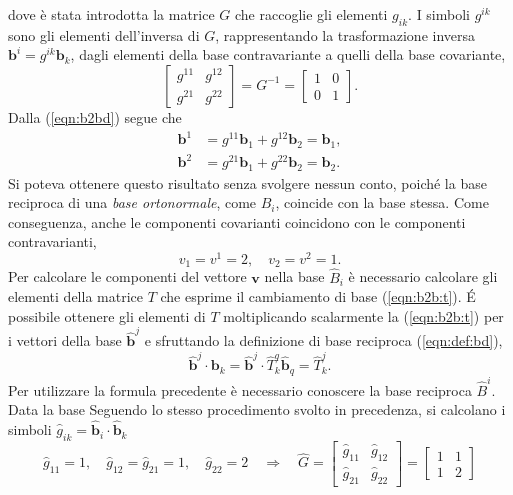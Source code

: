  dove è stata introdotta la matrice $G$ che raccoglie gli elementi $g_{ik}$. I simboli $g^{ik}$ sono gli elementi dell'inversa di $G$, rappresentando la trasformazione inversa $\bm{b}^i = g^{ik}\bm{b}_k$, dagli elementi della base contravariante a quelli della base covariante,
\begin{equation}
 \begin{bmatrix} g^{11} & g^{12} \\ g^{21} & g^{22} \end{bmatrix} = G^{-1} =
 \begin{bmatrix} 1 & 0 \\ 0 & 1 \end{bmatrix} .
\end{equation}
%
Dalla (\ref{eqn:b2bd}) segue che
\begin{equation}
\begin{aligned}
 \bm{b}^1 & = g^{11} \bm{b}_1 + g^{12} \bm{b}_2 = \bm{b}_1 , \\
 \bm{b}^2 & = g^{21} \bm{b}_1 + g^{22} \bm{b}_2 = \bm{b}_2 .
\end{aligned}
\end{equation}
Si poteva ottenere questo risultato senza svolgere nessun conto, poiché la base reciproca di una \textit{base ortonormale}, come $B_i$, coincide con la base stessa. Come conseguenza, anche le componenti covarianti coincidono con le componenti contravarianti,
\begin{equation}
  v_1 = v^1 = 2 , \quad v_2 = v^2 = 1 .
\end{equation}
%
Per calcolare le componenti del vettore $\bm{v}$ nella base $\hat{B}_i$ è necessario calcolare gli elementi della matrice $T$ che esprime il cambiamento di base (\ref{eqn:b2b:t}). \'E possibile ottenere gli elementi di $T$ moltiplicando scalarmente la (\ref{eqn:b2b:t}) per i vettori della base $\bm{\hat{b}}^j$ e sfruttando la definizione di base reciproca (\ref{eqn:def:bd}),
\begin{equation}\label{eqn:eseTrasf}
 \bm{\hat{b}}^j \cdot \bm{b}_k = \bm{\hat{b}}^j \cdot \hat{T}^{q}_{k} \bm{\hat{b}}_{q} = \hat{T}^{j}_{k} .
\end{equation}
%
Per utilizzare la formula precedente è necessario conoscere la base reciproca $\hat{B}^i$. Data la base  Seguendo lo stesso procedimento svolto in precedenza, si calcolano i simboli $\hat{g}_{ik} = \bm{\hat{b}}_i \cdot \bm{\hat{b}}_k$
\begin{equation}
 \hat{g}_{11} = 1 , \quad \hat{g}_{12} = \hat{g}_{21} = 1 , \quad \hat{g}_{22} = 2
\quad \Rightarrow \quad
 \hat{G} = \begin{bmatrix} \hat{g}_{11} & \hat{g}_{12} \\
                           \hat{g}_{21} & \hat{g}_{22} \end{bmatrix}
         = \begin{bmatrix} 1 & 1 \\ 1 & 2 \end{bmatrix}
\end{equation}
